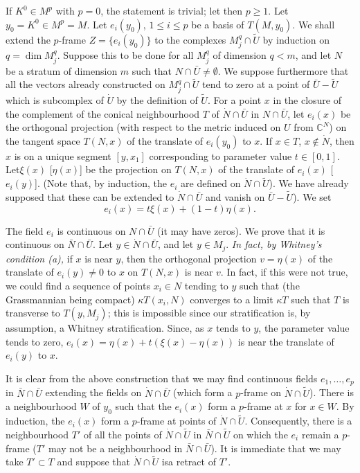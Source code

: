 If $K^{0}\in M^{p}$ with $p=0$, the statement is trivial; let then
$p\geq 1$. Let $y_{0}=K^{0}\in M^{p}=M$. Let $e_{i}(y_{0})$, $1\leq
i\leq p$ be a basis of $T(M,y_{0})$. We shall extend the $p$-frame
$Z=\{e_{i}(y_{0})\}$ to the complexes $M^{q}_{j}\cap \widetilde{U}$ by
induction on $q=\dim M^{q}_{j}$. Suppose this to be done for all
$M^{q}_{j}$ of dimension $q<m$, and let $N$ be a stratum of dimension
$m$ such that $N\cap \bar{U}\neq \emptyset$. We suppose furthermore
that all the vectors already constructed on $M^{q}_{j}\cap
\widetilde{U}$ tend to zero at a point of $\bar{U}-\widetilde{U}$
which is subcomplex of $\dot{U}$ by the definition of
$\widetilde{U}$. For a point $x$ in the closure of the complement of
the conical neighbourhood $T$ of $\dot{N}\cap \bar{U}$ in $N\cap
\bar{U}$, let $e_{i}(x)$ be the orthogonal projection (with respect to
the metric induced on $U$ from $\mathbb{C}^{N}$) on the tangent space
$T(N,x)$ of the translate of $e_{i}(y_{0})$ to $x$. If $x\in T$,
$x\notin \dot{N}$, then $x$ is on a unique segment $[y,x_{1}]$
corresponding to parameter value $t\in[0,1]$.     
Let\pageoriginale $\xi(x)$ [\resp $\eta(x)$] be the projection on
$T(N,x)$ of the translate of $e_{i}(x)$ [\resp $e_{i}(y)$]. (Note
that, by induction, the $e_{i}$ are defined on $\dot{N}\cap
\widetilde{U}$). We have already supposed that these can be extended
to $\dot{N}\cap \bar{U}$ and vanish on $\bar{U}-\widetilde{U}$). We
set
$$
e_{i}(x)=t\xi(x)+(1-t)\eta(x).
$$

The field $e_{i}$ is continuous on $N\cap \bar{U}$ (it may have
zeros). We prove that it is continuous on $\bar{N}\cap \bar{U}$. Let
$y\in\dot{N}\cap \bar{U}$, and let $y\in M_{j}$. {\em In fact, by
  Whitney's condition (a),} if $x$ is near $y$, then the orthogonal
projection $v=\eta(x)$ of the translate of $e_{i}(y)\neq 0$ to $x$ on
$T(N,x)$ is near $v$. In fact, if this were not true, we could find a
sequence of points $x_{i}\in N$ tending to $y$ such that (the
Grassmannian being compact) $\kappa T(x_{i},N)$ converges to a
limit $\kappa T$ such that $T$ is transverse to $T(y,M_{j})$; this is
impossible since our stratification is, by assumption, a Whitney
stratification. Since, as $x$ tends to $y$, the parameter value tends
to zero, $e_{i}(x)=\eta(x)+t(\xi(x)-\eta(x))$ is near the translate of
$e_{i}(y)$ to $x$.

It is clear from the above construction that we may find continuous
fields $e_{1},\ldots,e_{p}$ in $\bar{N}\cap \bar{U}$ extending the
fields on $\dot{N}\cap \bar{U}$ (which form a $p$-frame on
$\dot{N}\cap \widetilde{U}$). There is a neighbourhood $W$ of $y_{0}$
such that the $e_{i}(x)$ form a $p$-frame at $x$ for $x\in W$. By
induction, the $e_{i}(x)$ form a $p$-frame at points of $\dot{N}\cap
\widetilde{U}$. Consequently, there is a neighbourhood $T'$ of all the
points of $\dot{N}\cap \widetilde{U}$ in $\bar{N}\cap \widetilde{U}$
on which the $e_{i}$ remain a $p$-frame ($T'$ may not be a
neighbourhood in $\bar{N}\cap \bar{U}$). It is immediate that we may
take $T'\subset T$ and suppose that $\dot{N}\cap \widetilde{U}$
is\pageoriginale a retract of $T'$.


